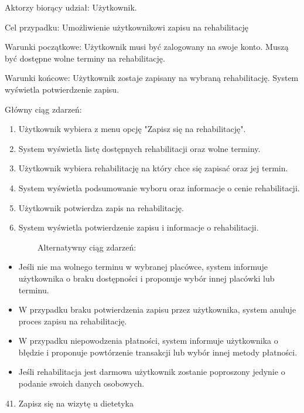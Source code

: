 {Aktorzy biorący udział: Użytkownik.}

{Cel przypadku: Umożliwienie użytkownikowi zapisu na rehabilitację}

{Warunki początkowe: Użytkownik musi być zalogowany na swoje konto.
Muszą być dostępne wolne terminy na rehabilitację.}

{Warunki końcowe: Użytkownik zostaje zapisany na wybraną rehabilitację.
System wyświetla potwierdzenie zapisu.}

{Główny ciąg zdarzeń:}

\begin{enumerate}
\tightlist
\item
  {Użytkownik wybiera z menu opcję "Zapisz się na rehabilitację".}
\item
  {System wyświetla listę dostępnych rehabilitacji oraz wolne terminy.}
\item
  {Użytkownik wybiera rehabilitację na który chce się zapisać oraz jej
  termin.}
\item
  {System wyświetla podsumowanie wyboru oraz informacje o cenie
  rehabilitacji.}
\item
  {Użytkownik potwierdza zapis na rehabilitację.}
\item
  {System wyświetla potwierdzenie zapisu i informacje o rehabilitacji.}
\end{enumerate}

{~~~~~~~~Alternatywny ciąg zdarzeń:}

\begin{itemize}
\tightlist
\item
  {Jeśli nie ma wolnego terminu w wybranej placówce, system informuje
  użytkownika o braku dostępności i proponuje wybór innej placówki lub
  terminu.}
\item
  {W przypadku braku potwierdzenia zapisu przez użytkownika, system
  anuluje proces zapisu na rehabilitację.}
\item
  {W przypadku niepowodzenia płatności, system informuje użytkownika o
  błędzie i proponuje powtórzenie transakcji lub wybór innej metody
  płatności.}
\item
  {Jeśli rehabilitacja jest darmowa użytkownik zostanie poproszony
  jedynie o podanie swoich danych osobowych.}
\end{itemize}

{\hfill\break
}

\begin{enumerate}
\setcounter{enumi}{40}
\tightlist
\item
  {Zapisz się na wizytę u dietetyka}
\end{enumerate}

